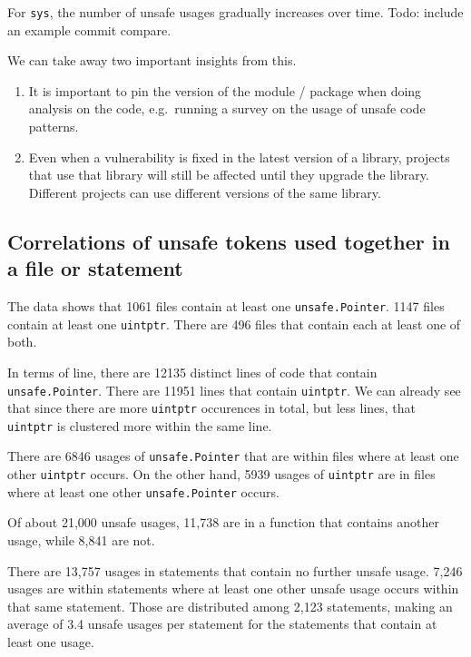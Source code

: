 For \texttt{sys}, the number of unsafe usages gradually increases over time.
Todo: include an example commit compare.

We can take away two important insights from this.

\begin{enumerate}
    \item It is important to pin the version of the module / package when doing analysis on the code, e.g.\ running a
    survey on the usage of unsafe code patterns.
    \item Even when a vulnerability is fixed in the latest version of a library, projects that use that library will
    still be affected until they upgrade the library.
    Different projects can use different versions of the same library.
\end{enumerate}


\subsection{Correlations of unsafe tokens used together in a file or statement}\label{subsec:results-correlation-together}

The data shows that 1061 files contain at least one \texttt{unsafe.Pointer}.
1147 files contain at least one \texttt{uintptr}.
There are 496 files that contain each at least one of both.

In terms of line, there are 12135 distinct lines of code that contain \texttt{unsafe.Pointer}.
There are 11951 lines that contain \texttt{uintptr}.
We can already see that since there are more \texttt{uintptr} occurences in total, but less lines, that \texttt{uintptr}
is clustered more within the same line.

There are 6846 usages of \texttt{unsafe.Pointer} that are within files where at least one other \texttt{uintptr} occurs.
On the other hand, 5939 usages of \texttt{uintptr} are in files where at least one other \texttt{unsafe.Pointer} occurs.

Of about 21,000 unsafe usages, 11,738 are in a function that contains another usage, while 8,841 are not.

There are 13,757 usages in statements that contain no further unsafe usage.
7,246 usages are within statements where at least one other unsafe usage occurs within that same statement.
Those are distributed among 2,123 statements, making an average of 3.4 unsafe usages per statement for the statements
that contain at least one usage.

